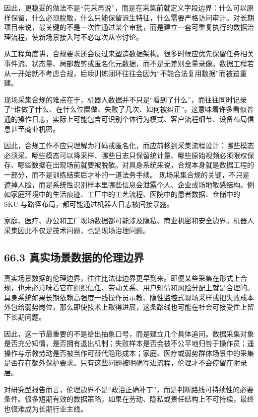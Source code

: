 因此，更稳妥的做法不是“先采再说”，而是在采集前就定义字段边界：什么可以原样保留，什么必须脱敏，什么只能保留派生特征，什么需要严格访问审计。对长期项目来说，最关键的不是一次性通过某个审批，而是建立一套可重复执行的数据治理流程，使新场景接入时不必每次从零讨论。

从工程角度讲，合规要求还会反过来塑造数据架构。很多时候应优先保留任务相关事件流、状态量、局部裁剪或匿名化元数据，而不是无差别全量录像。数据工程若从一开始就不考虑合规，后续训练闭环往往会因为“不能合法复用数据”而被迫重建。

现场采集合规的难点在于，机器人数据并不只是“看到了什么”，而往往同时记录了“谁做了什么、在什么位置做、失败了几次、如何被纠正”。这意味着许多看似普通的操作日志，实际上可能包含可识别个体行为模式、客户流程细节、设备布局信息甚至商业机密。

因此，合规工作不应只理解为打码或匿名化，而应前移到采集流程设计：哪些模态必须采、哪些模态可以降采样、哪些日志只保留统计量、哪些原始视频必须限权保存、哪些数据在出现场前就要被脱敏。对具身系统来说，合规本身就是数据工程的一部分，而不是训练结束后才补的一道法务手续。 现场采集合规的关键，不只是遮掉人脸，而是系统性识别样本里哪些信息会泄露个人、企业或场地敏感结构。例如家庭环境中的生活痕迹、工厂中的工艺流程、医院中的患者数据、仓储中的 SKU 与路径布局，都可能通过机器人日志被间接暴露。

家庭、医疗、办公和工厂现场数据都可能涉及隐私、商业机密和安全边界。机器人采集因此不仅是技术问题，也是现场治理问题。

\subsection*{66.3 真实场景数据的伦理边界}


真实场景数据的伦理边界，往往比法律边界更早到来。即便某些采集在形式上合规，也未必意味着它在组织信任、劳动关系、用户知情和风险分配上就是合理的。具身系统如果长期依赖高强度一线操作员示教、隐性监控式现场采样或把失败成本外包给弱势岗位，那么即使技术上取得进展，这条路线也可能在社会可接受性上留下长期问题。

因此，这一节最重要的不是给出抽象口号，而是建立几个具体追问。数据采集对象是否充分知情，是否拥有退出机制；失败样本是否会被不公平地归咎于操作员；遥操作与示教劳动是否被当作可替代隐形成本；家庭、医疗或弱势群体场景中的采集是否存在额外保护要求。只有这些问题被明确写进流程，伦理才不会停留在附录层。

对研究型报告而言，伦理边界不是“政治正确补丁”，而是判断路线可持续性的必要条件。很多短期有效的数据策略，如果在劳动、隐私或责任结构上不可持续，最终也很难成为长期行业主线。

